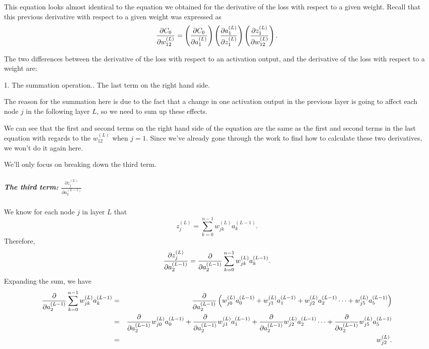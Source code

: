 \documentclass{article}
\begin{document}
\vspace{1pt}This equation looks almost identical to the equation we obtained
for the derivative of the loss with respect to a given weight.\newline
Recall that this previous derivative with respect to a given weight was
expressed as 
\[
\frac{\partial C_{0}}{\partial w_{12}^{(L)}}=\left( \frac{\partial C_{0}}{%
\partial a_{1}^{(L)}}\right) \left( \frac{\partial a_{1}^{(L)}}{\partial
z_{1}^{(L)}}\right) \left( \frac{\partial z_{1}^{(L)}}{\partial w_{12}^{(L)}}%
\right) \text{.} 
\]

The two differences between the derivative of the loss with respect to an
activation output, and the derivative of the loss with respect to a weight
are:

\vspace{1pt}1. The summation operation.. The last term on the right hand side.

The reason for the summation here is due to the fact that a change in one
activation output in the previous layer is going to affect each node $j$ in
the following layer $L$, so we need to sum up these effects.

We can see that the first and second terms on the right hand side of the
equation are the same as the first and second terms in the last equation
with regards to the $w_{12}^{\left( L\right) }$ when $j=1$. Since we've
already gone through the work to find how to calculate these two
derivatives, we won't do it again here.

We'll only focus on breaking down the third term.

\subparagraph{The third term: $\frac{\partial z_{j}^{(L)}}{\partial
a_{2}^{(L-1)}}$}

We know for each node $j$ in layer $L$ that%
\[
z_{j}^{(L)}=\sum_{k=0}^{n-1}w_{jk}^{(L)}a_{k}^{(L-1)}\text{.} 
\]%
Therefore, 
\[
\frac{\partial z_{j}^{(L)}}{\partial a_{2}^{(L-1)}}=\frac{\partial }{%
\partial a_{2}^{(L-1)}}\sum_{k=0}^{n-1}w_{jk}^{(L)}a_{k}^{(L-1)}\text{.} 
\]%
Expanding the sum, we have%
\begin{eqnarray*}
\frac{\partial }{\partial a_{2}^{(L-1)}}%
\sum_{k=0}^{n-1}w_{jk}^{(L)}a_{k}^{(L-1)} &=&\frac{\partial }{\partial
a_{2}^{(L-1)}}\left(
w_{j0}^{(L)}a_{0}^{(L-1)}+w_{j1}^{(L)}a_{1}^{(L-1)}+w_{j2}^{(L)}a_{2}^{(L-1)}\cdots +w_{j5}^{(L)}a_{5}^{(L-1)}\right)
\\
&=&\frac{\partial }{\partial a_{2}^{(L-1)}}w_{j0}^{(L)}a_{0}^{(L-1)}+\frac{%
\partial }{\partial a_{2}^{(L-1)}}w_{j1}^{(L)}a_{1}^{(L-1)}+\frac{\partial }{%
\partial a_{2}^{(L-1)}}w_{j2}^{(L)}a_{2}^{(L-1)}\cdots +\frac{\partial }{%
\partial a_{2}^{(L-1)}}w_{j5}^{(L)}a_{5}^{(L-1)} \\
&=&w_{j2}^{(L)}\text{.}
\end{eqnarray*}
\end{document}

